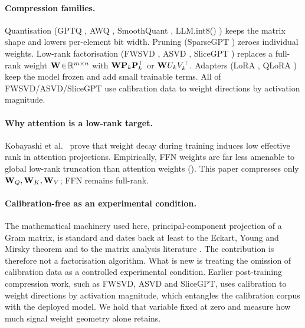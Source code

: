 \documentclass[11pt]{article}
\begin{document}
\paragraph{Compression families.}
Quantisation (GPTQ \cite{frantar2022gptq}, AWQ \cite{lin2023awq},
SmoothQuant \cite{xiao2022smoothquant}, LLM.int8() \cite{dettmers2022llmint8})
keeps the matrix shape and lowers per-element bit width.  Pruning
(SparseGPT \cite{frantar2023sparsegpt}) zeroes individual weights.
Low-rank factorisation (FWSVD \cite{hsu2022fwsvd}, ASVD
\cite{yuan2023asvd}, SliceGPT \cite{ashkboos2024slicegpt}) replaces a
full-rank weight $\mathbf{W}\!\in\!\mathbb{R}^{m\times n}$ with $\mathbf{W}\mathbf{P}_k\mathbf{P}_k^\top$
or $\mathbf{W} U_kV_k^\top$.  Adapters (LoRA \cite{hu2021lora},
QLoRA \cite{dettmers2023qlora}) keep the model frozen and add small
trainable terms.  All of FWSVD/ASVD/SliceGPT use calibration data to
weight directions by activation magnitude.

\paragraph{Why attention is a low-rank target.}
Kobayashi et al.\ \cite{kobayashi2024lowrankattn} prove that weight decay
during training induces low effective rank in attention projections.
Empirically, FFN weights are far less amenable to global low-rank truncation
than attention weights ().  This paper compresses only
$\mathbf{W}_Q,\mathbf{W}_K,\mathbf{W}_V$; FFN remains full-rank.

\paragraph{Calibration-free as an experimental condition.}
The mathematical machinery used here, principal-component projection of a
Gram matrix, is standard and dates back at least to the
Eckart, Young and Mirsky theorem \cite{eckart1936} and to the matrix
analysis literature \cite{trefethen1997nla,golub2013matrix}. The
contribution is therefore not a factorisation algorithm. What is new is
treating the omission of calibration data as a controlled experimental
condition. Earlier post-training compression work, such as FWSVD, ASVD and
SliceGPT, uses calibration to weight directions by activation magnitude,
which entangles the calibration corpus with the deployed model. We hold
that variable fixed at zero and measure how much signal weight geometry
alone retains.
\end{document}
